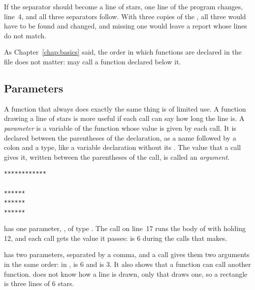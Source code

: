 

If the separator should become a line of stars, one line of the program changes,
line~4, and all three separators follow. With three copies of the
, all three would have to be found and changed, and missing one
would leave a report whose lines do not match.

As Chapter~\ref{chap:basics} said, the order in which functions are declared in
the file does not matter:  may call a function declared below it.

\subsection{Parameters}
\label{sec:functions:parameters}

A function that always does exactly the same thing is of limited use. A function
drawing a line of stars is more useful if each call can say how long the line
is. A \textit{parameter} is a variable of the function whose value is given by
each call. It is declared between the parentheses of the declaration, as a name
followed by a colon and a type, like a variable declaration without its
. The value that a call gives it, written between the parentheses of
the call, is called an \textit{argument}.


\vspace{-10pt}%
\begin{lstlisting}[style=bashVerb]
************

******
******
******
\end{lstlisting}

 has one parameter, , of type . The call
 on line~17 runs the body of  with 
holding 12, and each call gets the value it passes:  is 6 during the
calls that  makes.

 has two parameters, separated by a comma, and a call gives
them two arguments in the same order: in , 
is 6 and  is 3. It also shows that a function can call another
function.  does not know how a line is drawn, only that
 draws one, so a rectangle is three lines of 6 stars.

